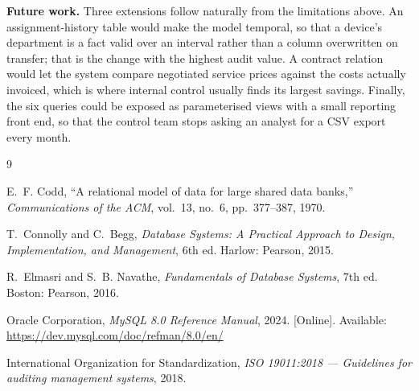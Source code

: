 \documentclass[conference]{IEEEtran}
\begin{document}
\textbf{Future work.} Three extensions follow naturally from the limitations
above. An assignment-history table would make the model temporal, so that a
device's department is a fact valid over an interval rather than a column
overwritten on transfer; that is the change with the highest audit value. A
contract relation would let the system compare negotiated service prices
against the costs actually invoiced, which is where internal control usually
finds its largest savings. Finally, the six queries could be exposed as
parameterised views with a small reporting front end, so that the control team
stops asking an analyst for a CSV export every month.

\begin{thebibliography}{9}

E.~F. Codd, ``A relational model of data for large shared data banks,''
\emph{Communications of the ACM}, vol.~13, no.~6, pp.~377--387, 1970.

T.~Connolly and C.~Begg, \emph{Database Systems: A Practical Approach to
Design, Implementation, and Management}, 6th ed. Harlow: Pearson, 2015.

R.~Elmasri and S.~B. Navathe, \emph{Fundamentals of Database Systems},
7th ed. Boston: Pearson, 2016.

Oracle Corporation, \emph{MySQL 8.0 Reference Manual}, 2024.
[Online]. Available: \url{https://dev.mysql.com/doc/refman/8.0/en/}

International Organization for Standardization, \emph{ISO 19011:2018 ---
Guidelines for auditing management systems}, 2018.

\end{thebibliography}
\end{document}

